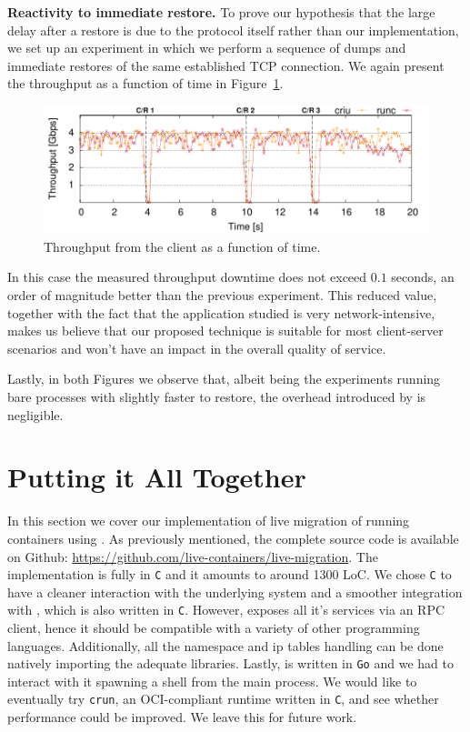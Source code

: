 \textbf{Reactivity to immediate restore.}
To prove our hypothesis that the large delay after a restore is due to the protocol itself rather than our implementation, we set up an experiment in which we perform a sequence of dumps and immediate restores of the same established TCP connection.
We again present the throughput as a function of time in Figure~\ref{fig:evaluation-reactivity}.
\begin{figure}[h!]
    \centering
    \includegraphics[width=\linewidth]{./figs/tcp-established-resolution/tcp_established_resolution_microbenchmark.pdf}
    \caption{Throughput from the client as a function of time.\label{fig:evaluation-reactivity}}
\end{figure}
In this case the measured throughput downtime does not exceed $0.1$ seconds, an order of magnitude better than the previous experiment.
This reduced value, together with the fact that the application studied is very network-intensive, makes us believe that our proposed technique is suitable for most client-server scenarios and won't have an impact in the overall quality of service.

Lastly, in both Figures we observe that, albeit being the experiments running bare processes with \criu slightly faster to restore, the overhead introduced by \runc is negligible.

\section{Putting it All Together} \label{sec:system}

In this section we cover our implementation of live migration of running \runc containers using \criu.
As previously mentioned, the complete source code is available on Github: \url{https://github.com/live-containers/live-migration}.
The implementation is fully in \texttt{C} and it amounts to around 1300 LoC.
We chose \texttt{C} to have a cleaner interaction with the underlying system and a smoother integration with \criu, which is also written in \texttt{C}.
However, \criu exposes all it's services via an RPC client, hence it should be compatible with a variety of other programming languages.
Additionally, all the namespace and ip tables handling can be done natively importing the adequate libraries.
Lastly, \runc is written in \texttt{Go} and we had to interact with it spawning a shell from the main process.
We would like to eventually try \texttt{crun}, an OCI-compliant runtime written in \texttt{C}, and see whether performance could be improved.
We leave this for future work.

